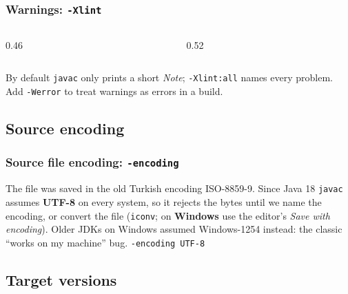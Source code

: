 \documentclass[aspectratio=169,10pt,compress]{beamer}
\newcommand{\win}{\textbf{Windows}}
\begin{document}
\begin{frame}[t,fragile] \frametitle{Warnings: \texttt{-Xlint}}
  \begin{columns}[T]
    \begin{column}{0.46\textwidth}
    \end{column}
    \begin{column}{0.52\textwidth}
    \end{column}
  \end{columns}

  \vspace{0.1em}
  \small By default \texttt{javac} only prints a short \emph{Note}; \texttt{-Xlint:all} names every problem.
  Add \texttt{-Werror} to treat warnings as errors in a build.
\end{frame}

\subsection[Encoding]{Source encoding}




\begin{frame}[t,fragile] \frametitle{Source file encoding: \texttt{-encoding}}

  \vspace{0.1em}
  \small
  The file was saved in the old Turkish encoding ISO-8859-9. Since Java 18 \texttt{javac} assumes \textbf{UTF-8} on every system, so
  it rejects the bytes until we name the encoding, or convert the file (\texttt{iconv}; on \win{} use the editor's \emph{Save with encoding}). Older JDKs on Windows assumed Windows-1254 instead: the classic
  ``works on my machine'' bug.  \texttt{-encoding UTF-8} 
\end{frame}

\subsection[Release]{Target versions}
\end{document}

